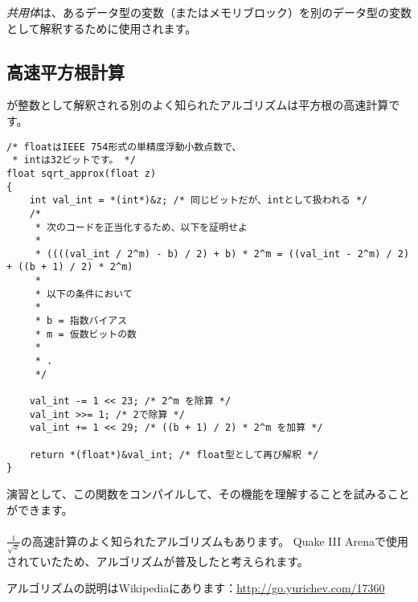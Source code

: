 
\CCpp \emph{共用体}は、あるデータ型の変数（またはメモリブロック）を別のデータ型の変数として解釈するために使用されます。





\subsection{高速平方根計算}

\Tfloat が整数として解釈される別のよく知られたアルゴリズムは平方根の高速計算です。

\begin{lstlisting}[caption=ソースコードはウィキペディアから取りました: \url{http://go.yurichev.com/17364},style=customc]
/* floatはIEEE 754形式の単精度浮動小数点数で、
 * intは32ビットです。 */
float sqrt_approx(float z)
{
    int val_int = *(int*)&z; /* 同じビットだが、intとして扱われる */
    /*
     * 次のコードを正当化するため、以下を証明せよ
     *
     * ((((val_int / 2^m) - b) / 2) + b) * 2^m = ((val_int - 2^m) / 2) + ((b + 1) / 2) * 2^m)
     *
     * 以下の条件において
     *
     * b = 指数バイアス
     * m = 仮数ビットの数
     *
     * .
     */
 
    val_int -= 1 << 23; /* 2^m を除算 */
    val_int >>= 1; /* 2で除算 */
    val_int += 1 << 29; /* ((b + 1) / 2) * 2^m を加算 */
 
    return *(float*)&val_int; /* float型として再び解釈 */
}
\end{lstlisting}

演習として、この関数をコンパイルして、その機能を理解することを試みることができます。\\
\\
$\frac{1}{\sqrt{x}}$の高速計算のよく知られたアルゴリズムもあります。
Quake III Arenaで使用されていたため、アルゴリズムが普及したと考えられます。

アルゴリズムの説明はWikipediaにあります：\url{http://go.yurichev.com/17360}


